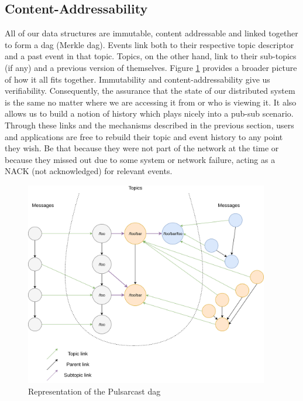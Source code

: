 \subsection{Content-Addressability}\label{subsec:content-addressability}

All of our data structures are immutable, content addressable and linked
together to form a \acrlong{dag} (Merkle \acrshort{dag}). Events link both to
their respective topic descriptor and a past event in that topic. Topics, on
the other hand, link to their sub-topics (if any) and a previous version of
themselves.  Figure \ref{fig:pulsarcast-dag} provides a broader picture of how
it all fits together. Immutability and content-addressability give us
verifiability. Consequently, the assurance that the state of our distributed
system is the same no matter where we are accessing it from or who is viewing
it. It also allows us to build a notion of history which plays nicely into a
pub-sub scenario. Through these links and the mechanisms described in the
previous section, users and applications are free to rebuild their topic and
event history to any point they wish. Be that because they were not part of the
network at the time or because they missed out due to some system or network
failure, acting as a NACK (not acknowledged) for relevant events.

\begin{figure}[hb!]
  \centering
  \includegraphics[width=0.95\textwidth]{img/pulsarcast-dag.png}
  \caption{Representation of the Pulsarcast \acrshort{dag}}
  \label{fig:pulsarcast-dag}
\end{figure}


